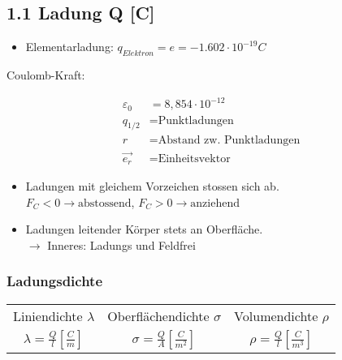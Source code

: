 \subsection*{1.1 Ladung Q [C]}

\begin{itemize}
    \item Elementarladung: $q_{Elektron} = e = - 1.602 \cdot 10^{-19}C$
\end{itemize}

Coulomb-Kraft: 

\begin{minipage}{0.53\linewidth}
    \begin{footnotesize}
        \begin{center}
        \end{center}
    \end{footnotesize}
\end{minipage}
\begin{minipage}{0.46\linewidth}
    \begin{scriptsize}
        \begin{center}
            \begin{align*}
                \varepsilon_0 &= 8,854\cdot10^{-12}
                \\q_{1/2} &= \text{Punktladungen}
                \\r &= \text{Abstand zw. Punktladungen}
                \\\overrightarrow{e_r} &= \text{Einheitsvektor}
            \end{align*}
        \end{center}
    \end{scriptsize}
\end{minipage}
\vspace{1mm}



\begin{itemize}
    \item Ladungen mit gleichem Vorzeichen stossen sich ab.
    \\$F_C<0 \rightarrow \text{abstossend}$,
    $F_C>0 \rightarrow \text{anziehend}$
    \item Ladungen leitender Körper stets an Oberfläche.\\
    $\rightarrow$ Inneres: Ladungs und Feldfrei
\end{itemize}

\subsubsection*{Ladungsdichte}

\begin{tabular}{c c c}
    Liniendichte $\lambda$ & Oberflächendichte $\sigma$ & Volumendichte $\rho$ \\
    $\lambda = \frac{Q}{l} \left[\frac{C}{m}\right]$ & $\sigma = \frac{Q}{A} \left[\frac{C}{m^2}\right]$ & $\rho = \frac{Q}{l} \left[\frac{C}{m^3}\right]$
\end{tabular}

